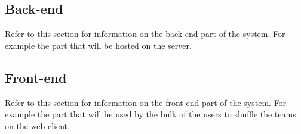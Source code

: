 \subsection{Back-end}
	Refer to this section for information on the back-end part of the system. For example the part that will be hosted on the server.\par
	\vspace{0.3cm}
	
	
\subsection{Front-end}
	Refer to this section for information on the front-end part of the system. For example the part that will be used by the bulk of the users to shuffle the teams on the web client.\par
	\vspace{0.3cm}
	